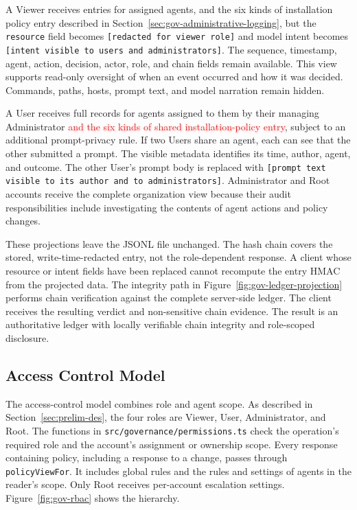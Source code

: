 \begingroup\setlength{\emergencystretch}{3em}
A Viewer receives entries for assigned agents{\color{red}, and the six kinds of installation policy entry described in Section~\ref{sec:gov-administrative-logging}}, but the \texttt{resource} field becomes
\texttt{[redacted for viewer role]} and model intent becomes
\texttt{[intent visible to users and administrators]}. The sequence, timestamp, agent, action, decision, actor, role, and chain fields remain available. This view supports read-only oversight of when an event occurred and how it was decided. Commands, paths, hosts, prompt text, and model narration remain hidden.\par\endgroup

A User receives full records for agents assigned to them by their managing Administrator\textcolor{red}{ and the six kinds of shared installation-policy entry}, subject to an additional prompt-privacy rule. If two Users share an agent, each can see that the other submitted a prompt. The visible metadata identifies its time, author, agent, and outcome. The other User's prompt body is replaced with
\texttt{[prompt text visible to its author and to administrators]}.
Administrator and Root accounts receive the complete organization view because their audit responsibilities include investigating the contents of agent actions and policy changes.

These projections leave the JSONL file unchanged. The hash chain covers the stored, write-time-redacted entry, not the role-dependent response. A client whose resource or intent fields have been replaced cannot recompute the entry HMAC from the projected data. The integrity path in
Figure~\ref{fig:gov-ledger-projection} performs chain verification against the complete server-side ledger. The client receives the resulting verdict and non-sensitive chain evidence. The result is an authoritative ledger with {\color{red}locally verifiable chain integrity} and role-scoped disclosure.

\FloatBarrier

\subsection{Access Control Model}
\label{sec:gov-rbac}

{\color{red}The access-control model combines role and agent scope. As described in
Section~\ref{sec:prelim-des}, the four roles are Viewer, User, Administrator, and
Root. The functions in \texttt{src/governance/permissions.ts} check the
operation's required role and the account's assignment or ownership scope.
Every response containing policy, including a response to a change, passes
through \texttt{policyViewFor}. It includes global rules and the rules and
settings of agents in the reader's scope. Only Root receives per-account
escalation settings. Figure~\ref{fig:gov-rbac} shows the hierarchy.}

